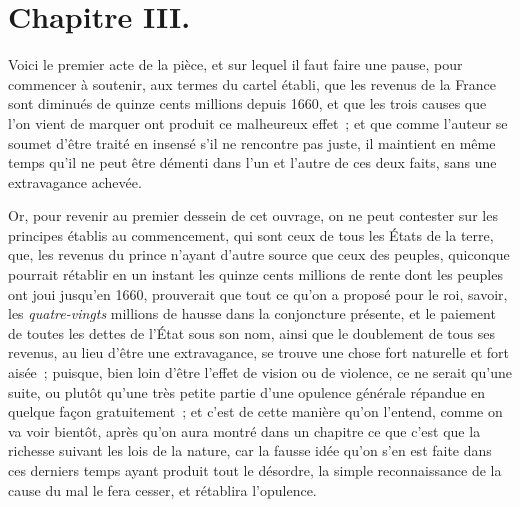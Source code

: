 \documentclass[french,twoside]{book} %
\begin{document}
\section[{Chapitre III.}]{Chapitre III.}
\noindent Voici le premier acte de la pièce, et sur lequel il faut faire une pause, pour commencer à soutenir, aux termes du cartel établi, que les revenus de la France sont diminués de quinze cents millions depuis 1660, et que les trois causes que l’on vient de marquer ont produit ce malheureux effet ; et que comme l’auteur se soumet d’être traité en insensé s’il ne rencontre pas juste, il maintient en même temps qu’il ne peut être démenti dans l’un et l’autre de ces deux faits, sans une extravagance achevée.\par
Or, pour revenir au premier dessein de cet ouvrage, on ne peut contester sur les principes établis au commencement, qui sont ceux de tous les États de la terre, que, les revenus du prince n’ayant d’autre source que ceux des peuples, quiconque pourrait rétablir en un instant les quinze cents millions de rente dont les peuples ont joui jusqu’en 1660, prouverait que tout ce qu’on a proposé pour le roi, savoir, les {\itshape quatre-vingts} millions de hausse dans la conjoncture présente, et le paiement de toutes les dettes de l’État sous son nom, ainsi que le doublement de tous ses revenus, au lieu d’être une extravagance, se trouve une chose fort naturelle et fort aisée ; puisque, bien loin d’être l’effet de vision ou de violence, ce ne serait qu’une suite, ou plutôt qu’une très petite partie d’une opulence générale répandue en quelque façon gratuitement ; et c’est de cette manière qu’on l’entend, comme on va voir bientôt, après qu’on aura montré dans un chapitre ce que c’est que la richesse suivant les lois de la nature, car la fausse idée qu’on s’en est faite dans ces derniers temps ayant produit tout le désordre, la simple reconnaissance de la cause du mal le fera cesser, et rétablira l’opulence.
\end{document}
